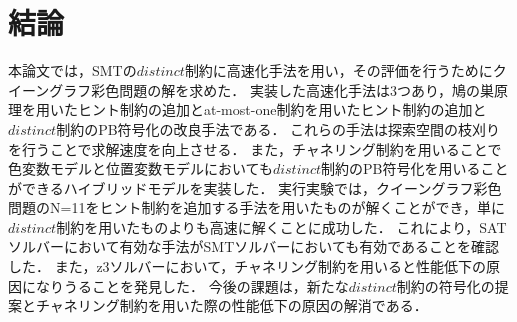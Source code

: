 \chapter{結論}

本論文では，SMTの$distinct$制約に高速化手法を用い，その評価を行うためにクイーングラフ彩色問題の解を求めた．
実装した高速化手法は3つあり，鳩の巣原理を用いたヒント制約の追加とat-most-one制約を用いたヒント制約の追加と$distinct$制約のPB符号化の改良手法である．
これらの手法は探索空間の枝刈りを行うことで求解速度を向上させる．
また，チャネリング制約を用いることで色変数モデルと位置変数モデルにおいても$distinct$制約のPB符号化を用いることができるハイブリッドモデルを実装した．
実行実験では，クイーングラフ彩色問題のN=11をヒント制約を追加する手法を用いたものが解くことができ，単に$distinct$制約を用いたものよりも高速に解くことに成功した．
これにより，SATソルバーにおいて有効な手法がSMTソルバーにおいても有効であることを確認した．
また，z3ソルバーにおいて，チャネリング制約を用いると性能低下の原因になりうることを発見した．
今後の課題は，新たな$distinct$制約の符号化の提案とチャネリング制約を用いた際の性能低下の原因の解消である．


